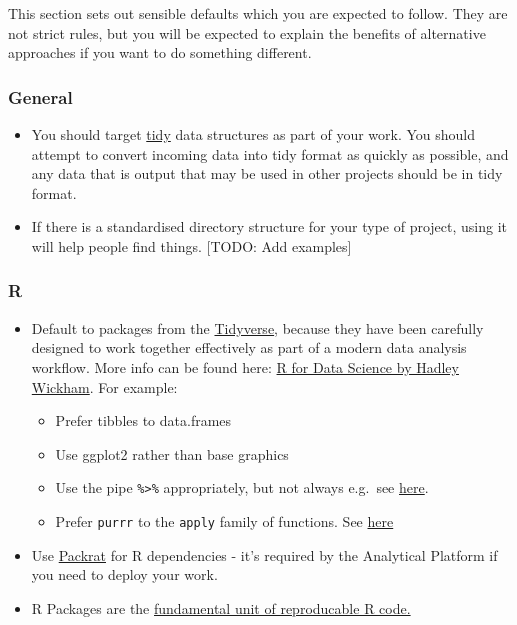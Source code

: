 \documentclass[]{book}
\providecommand{\tightlist}{%
  \setlength{\itemsep}{0pt}\setlength{\parskip}{0pt}}
\begin{document}
This section sets out sensible defaults which you are expected to follow. They are not strict rules, but you will be expected to explain the benefits of alternative approaches if you want to do something different.

\hypertarget{general}{%
\subsubsection*{General}\label{general}}

\begin{itemize}
\tightlist
\item
  You should target \href{http://vita.had.co.nz/papers/tidy-data.html}{tidy} data structures as part of your work. You should attempt to convert incoming data into tidy format as quickly as possible, and any data that is output that may be used in other projects should be in tidy format.
\item
  If there is a standardised directory structure for your type of project, using it will help people find things. {[}TODO: Add examples{]}
\end{itemize}

\hypertarget{r-1}{%
\subsubsection*{R}\label{r-1}}

\begin{itemize}
\tightlist
\item
  Default to packages from the \href{http://tidyverse.org/}{Tidyverse}, because they have been carefully designed to work together effectively as part of a modern data analysis workflow. More info can be found here: \href{http://r4ds.had.co.nz}{R for Data Science by Hadley Wickham}. For example:

  \begin{itemize}
  \tightlist
  \item
    Prefer tibbles to data.frames
  \item
    Use ggplot2 rather than base graphics
  \item
    Use the pipe \texttt{\%\textgreater{}\%} appropriately, but not always e.g.~see \href{https://twitter.com/hadleywickham/status/603883121197514752}{here}.\\
  \item
    Prefer \texttt{purrr} to the \texttt{apply} family of functions. See \href{http://r4ds.had.co.nz/iteration.html\#the-map-functions}{here}
  \end{itemize}
\item
  Use \href{https://rstudio.github.io/packrat/}{Packrat} for R dependencies - it's required by the Analytical Platform if you need to deploy your work.
\item
  R Packages are the \href{http://r-pkgs.had.co.nz/}{fundamental unit of reproducable R code.}
\end{itemize}
\end{document}
